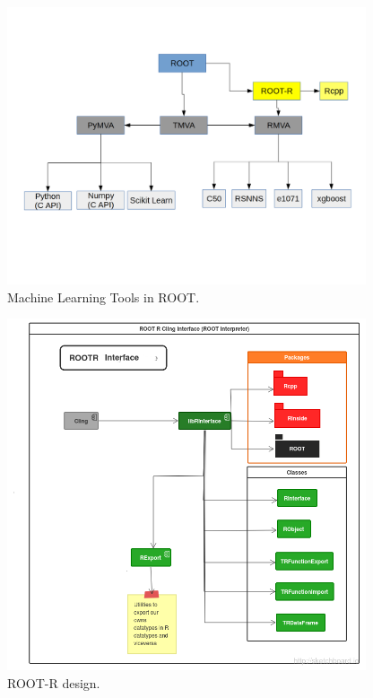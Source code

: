 \documentclass[a4paper]{jpconf}
\begin{document}
\begin{figure}[h]
\centering
\includegraphics[width=25pc]{img/tmva.png}\caption{\label{tmva:label} Machine Learning Tools in ROOT.}
\end{figure}

\begin{figure}[h]
\centering
\includegraphics[width=25pc]{img/rootr.png}\caption{\label{rootr:label} ROOT-R design.}
\end{figure}
\end{document}
